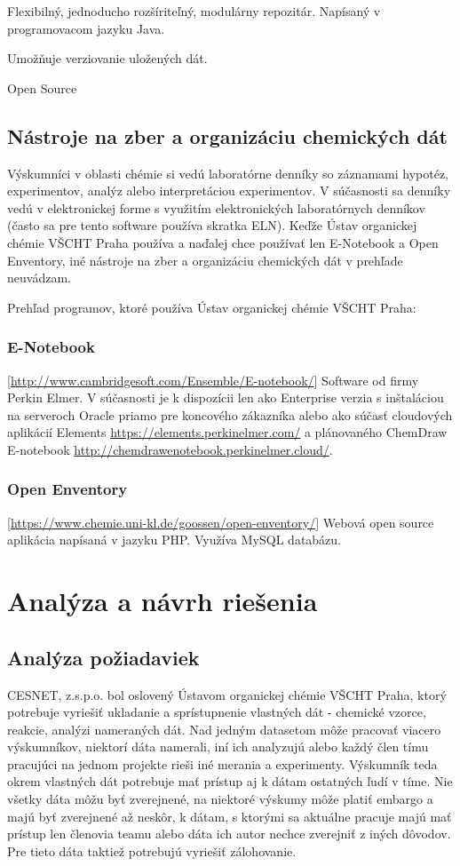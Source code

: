 \documentclass[thesis=M,slovak]{FITthesis}[2013/05/06]
\begin{document}
Flexibilný, jednoducho rozšíriteľný, modulárny repozitár. Napísaný v programovacom jazyku Java.

Umožňuje verziovanie uložených dát.

Open Source


\section{Nástroje na zber a organizáciu chemických dát}
Výskumníci v oblasti chémie si vedú laboratórne denníky so záznamami hypotéz, experimentov, analýz alebo interpretáciou experimentov. V súčasnosti sa denníky vedú v elektronickej forme s využitím elektronických laboratórnych denníkov (často sa pre tento software používa skratka ELN). Keďže Ústav organickej chémie VŠCHT Praha používa a naďalej chce používať len E-Notebook a Open Enventory, iné nástroje na zber a organizáciu chemických dát v prehľade neuvádzam.

Prehľad programov, ktoré používa Ústav organickej chémie VŠCHT Praha:
\subsection{E-Notebook} [\url{http://www.cambridgesoft.com/Ensemble/E-notebook/}]
Software od firmy Perkin Elmer. V súčasnosti je k dispozícii len ako Enterprise verzia s inštaláciou na serveroch Oracle priamo pre koncového zákazníka alebo ako súčasť cloudových aplikácií Elements \url{https://elements.perkinelmer.com/} a plánovaného ChemDraw E-notebook \url{http://chemdrawenotebook.perkinelmer.cloud/}.

\subsection{Open Enventory} [\url{https://www.chemie.uni-kl.de/goossen/open-enventory/}]
Webová open source aplikácia napísaná v jazyku PHP. Využíva MySQL databázu.

\chapter{Analýza a návrh riešenia}
\section{Analýza požiadaviek}
CESNET, z.s.p.o. bol oslovený Ústavom organickej chémie VŠCHT Praha, ktorý potrebuje vyriešiť ukladanie a sprístupnenie vlastných dát - chemické vzorce, reakcie, analýzi nameraných dát. Nad jedným datasetom môže pracovať viacero výskumníkov, niektorí dáta namerali, iní ich analyzujú alebo každý člen tímu pracujúci na jednom projekte rieši iné merania a experimenty. Výskumník teda okrem vlastných dát potrebuje mať prístup aj k dátam ostatných ľudí v tíme. Nie všetky dáta môžu byť zverejnené, na niektoré výskumy môže platiť embargo a majú byť zverejnené až neskôr, k dátam, s ktorými sa aktuálne pracuje majú mať prístup len členovia teamu alebo dáta ich autor nechce zverejniť z iných dôvodov. Pre tieto dáta taktiež potrebujú vyriešiť zálohovanie.
\end{document}
